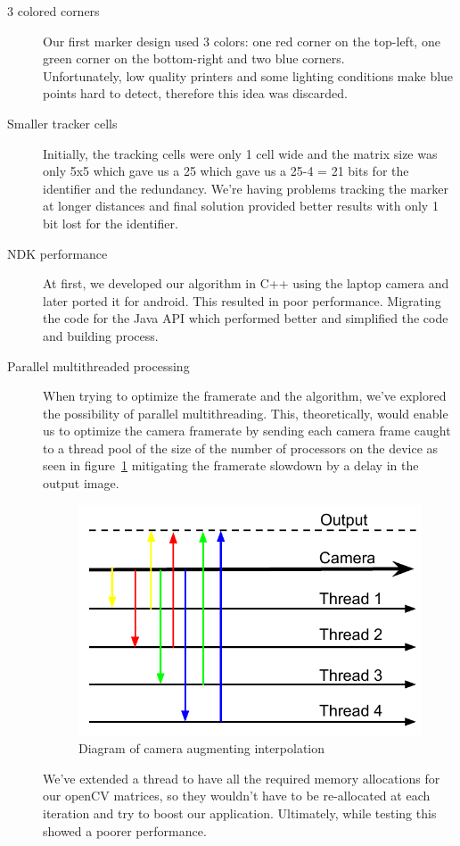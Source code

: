 \documentclass[DIV=calc, paper=a4, fontsize=11pt, twocolumn]{scrartcl}   %
\begin{document}
\begin{description}

\item[3 colored corners]
Our first marker design used 3 colors: one red corner on the top-left, one green corner on the bottom-right and two blue corners.\\
Unfortunately, low quality printers and some lighting conditions make blue points hard to detect, therefore this idea was discarded.

\item[Smaller tracker cells]
Initially, the tracking cells were only 1 cell wide and the matrix size was only 5x5 which gave us a 25 which gave us a 25-4 = 21 bits for the identifier and the redundancy.
We're having problems tracking the marker at longer distances and final solution provided better results with only 1 bit lost for the identifier.

\item[NDK performance]
At first, we developed our algorithm in C++ using the laptop camera and later ported it for android. This resulted in poor performance. Migrating the code for the Java API which performed better and simplified the code and building process.

\item[Parallel multithreaded processing]
When trying to optimize the framerate and the algorithm, we've explored the possibility of parallel multithreading. This, theoretically, would enable us to optimize the camera framerate by sending each camera frame caught to a thread pool of the size of the number of processors on the device as seen in figure~\ref{fig:threading} mitigating the framerate slowdown by a delay in the output image. 

\begin{figure}[!h]
    \centering
    \includegraphics[width=0.9\columnwidth]{threading.pdf}
    \caption{Diagram of camera augmenting interpolation}
    \label{fig:threading}
\end{figure}

We've extended a thread to have all the required memory allocations for our openCV matrices, so they wouldn't have to be re-allocated at each iteration and try to boost our application.
Ultimately, while testing this showed a poorer performance.

\end{description}
\end{document}
